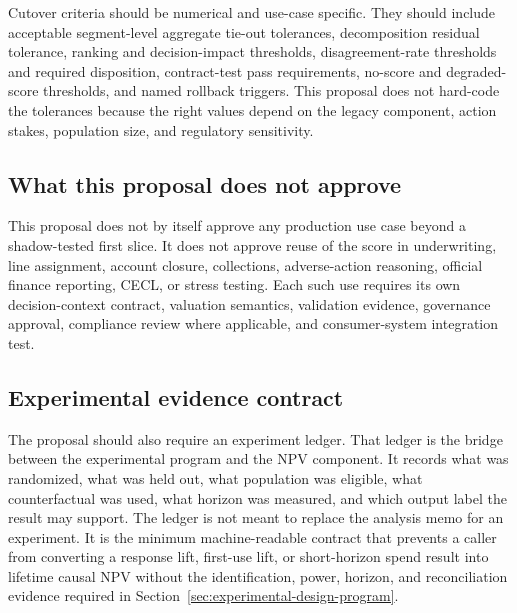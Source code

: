 \documentclass[11pt]{article}
\newcommand{\1}{\mathbf{1}}
\begin{document}
Cutover criteria should be numerical and use-case specific. They should include
acceptable segment-level aggregate tie-out tolerances, decomposition residual
tolerance, ranking and decision-impact thresholds, disagreement-rate thresholds
and required disposition, contract-test pass requirements, no-score and
degraded-score thresholds, and named rollback triggers. This proposal does not
hard-code the tolerances because the right values depend on the legacy
component, action stakes, population size, and regulatory sensitivity.

\subsection{What this proposal does not approve}
\label{subsec:not-approved}

This proposal does not by itself approve any production use case beyond a
shadow-tested first slice. It does not approve reuse of the score in
underwriting, line assignment, account closure, collections, adverse-action
reasoning, official finance reporting, CECL, or stress testing. Each such use
requires its own decision-context contract, valuation semantics, validation
evidence, governance approval, compliance review where applicable, and
consumer-system integration test.

\subsection{Experimental evidence contract}
\label{subsec:experimental-evidence-contract}

The proposal should also require an experiment ledger. That ledger is the
bridge between the experimental program and the NPV component. It records what
was randomized, what was held out, what population was eligible, what
counterfactual was used, what horizon was measured, and which output label the
result may support. The ledger is not meant to replace the analysis memo for
an experiment. It is the minimum machine-readable contract that prevents a
caller from converting a response lift, first-use lift, or short-horizon spend
result into lifetime causal NPV without the identification, power, horizon, and
reconciliation evidence required in
Section~\ref{sec:experimental-design-program}.
\end{document}
